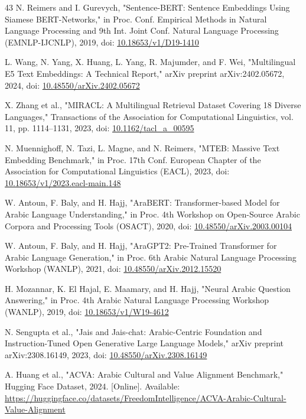 \begin{thebibliography}{43}
 N. Reimers and I. Gurevych, "Sentence-BERT: Sentence Embeddings Using Siamese BERT-Networks," in Proc. Conf. Empirical Methods in Natural Language Processing and 9th Int. Joint Conf. Natural Language Processing (EMNLP-IJCNLP), 2019, doi: \href{https://doi.org/10.18653/v1/D19-1410}{10.18653/v1/D19-1410}

 L. Wang, N. Yang, X. Huang, L. Yang, R. Majumder, and F. Wei, "Multilingual E5 Text Embeddings: A Technical Report," arXiv preprint arXiv:2402.05672, 2024, doi: \href{https://doi.org/10.48550/arXiv.2402.05672}{10.48550/arXiv.2402.05672}

 X. Zhang et al., "MIRACL: A Multilingual Retrieval Dataset Covering 18 Diverse Languages," Transactions of the Association for Computational Linguistics, vol. 11, pp. 1114--1131, 2023, doi: \href{https://doi.org/10.1162/tacl\_a\_00595}{10.1162/tacl\_a\_00595}

 N. Muennighoff, N. Tazi, L. Magne, and N. Reimers, "MTEB: Massive Text Embedding Benchmark," in Proc. 17th Conf. European Chapter of the Association for Computational Linguistics (EACL), 2023, doi: \href{https://doi.org/10.18653/v1/2023.eacl-main.148}{10.18653/v1/2023.eacl-main.148}

 W. Antoun, F. Baly, and H. Hajj, "AraBERT: Transformer-based Model for Arabic Language Understanding," in Proc. 4th Workshop on Open-Source Arabic Corpora and Processing Tools (OSACT), 2020, doi: \href{https://doi.org/10.48550/arXiv.2003.00104}{10.48550/arXiv.2003.00104}

 W. Antoun, F. Baly, and H. Hajj, "AraGPT2: Pre-Trained Transformer for Arabic Language Generation," in Proc. 6th Arabic Natural Language Processing Workshop (WANLP), 2021, doi: \href{https://doi.org/10.48550/arXiv.2012.15520}{10.48550/arXiv.2012.15520}

 H. Mozannar, K. El Hajal, E. Maamary, and H. Hajj, "Neural Arabic Question Answering," in Proc. 4th Arabic Natural Language Processing Workshop (WANLP), 2019, doi: \href{https://doi.org/10.18653/v1/W19-4612}{10.18653/v1/W19-4612}

 N. Sengupta et al., "Jais and Jais-chat: Arabic-Centric Foundation and Instruction-Tuned Open Generative Large Language Models," arXiv preprint arXiv:2308.16149, 2023, doi: \href{https://doi.org/10.48550/arXiv.2308.16149}{10.48550/arXiv.2308.16149}

 A. Huang et al., "ACVA: Arabic Cultural and Value Alignment Benchmark," Hugging Face Dataset, 2024. [Online]. Available: \url{https://huggingface.co/datasets/FreedomIntelligence/ACVA-Arabic-Cultural-Value-Alignment}


\end{thebibliography}
